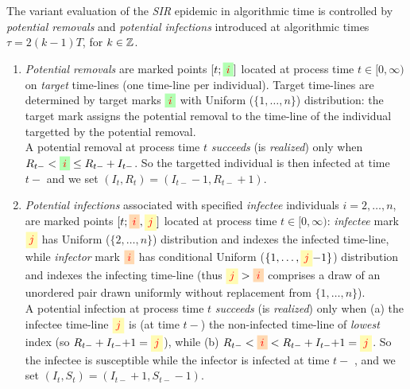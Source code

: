 \documentclass[]{article}
\newcommand{\SIR}{\emph{SIR}\xspace}
\newcommand{\target}{{\colorbox{green!30}{$\textcolor{red}{i}$}}}
\newcommand{\infectee}{{\colorbox{yellow!30}{$\textcolor{red}{j}$}}}
\newcommand{\infector}{{\colorbox{orange!30}{$\textcolor{red}{i}$}}}
\begin{document}
\begin{defn}
The variant evaluation of the \SIR epidemic in algorithmic time is controlled by
\label{def:potential}
\emph{potential removals} and \emph{potential infections}
introduced at algorithmic times \(\tau=2(k{-}1)T\),
for \(k\in\mathbb{Z}\).
\begin{enumerate}[1:]
\item[] \emph{Potential removals}
are marked points \([t;\target]\) located at process time \(t\in[0,\infty)\)
on \emph{target} time-lines (one time-line per individual).
Target time-lines are determined by target marks \(\target\)
with Uniform (\(\{1, \ldots, n\}\))
distribution: the target mark assigns the potential removal to 
the time-line of the individual targetted by the potential removal. 
\\
A potential removal at process time \(t\) 
\emph{succeeds} (is \emph{realized}) only when
\(R_{t-}< \target \leq R_{t-}+I_{t-}\).
So
the targetted individual is then infected at time \(t-\) and
we set
\((I_t, R_t) = (I_{t-}{-}1, R_{t-}{+}1)\).
\item[]
\emph{Potential infections} associated with specified \emph{infectee}
individuals \(i=2, \ldots, n\), 
are marked points \([t;\infector,\infectee]\) 
located at process time \(t\in[0,\infty)\):
\emph{infectee} mark \(\infectee\) has 
Uniform (\(\{2, \ldots, n\}\))
distribution
and indexes the infected time-line,
while \emph{infector} mark \(\infector\) has
conditional
Uniform (\(\{1, \ldots, \infectee{-}1\}\)) distribution
and indexes the infecting time-line
(thus \(\infectee>\infector\) comprises a draw of an 
unordered pair drawn uniformly without replacement from \(\{1, \ldots, n\}\)).
\\
A potential infection at process time \(t\) 
\emph{succeeds} (is \emph{realized})
only when
(a) the infectee time-line \(\infectee\) is (at time \(t-\)) 
the non-infected time-line of \emph{lowest} index (so \(R_{t-}+I_{t-}{+}1=\infectee\)),
while 
(b) \(R_{t-}<\infector<R_{t-}+I_{t-}{+}1=\infectee\).
So
the infectee is susceptible while the 
infector is infected at time \(t-\) , and we
set
\((I_t,S_t)=(I_{t-}{+}1, S_{t-}{-}1)\).
\end{enumerate}
\end{defn}
\end{document}
